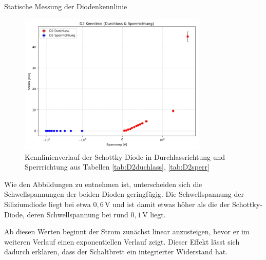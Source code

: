 \documentclass{article}
\theoremstyle{definition}
\begin{document}
\begin{aufgabe}{Statische Messung der Diodenkennlinie}
    \begin{figure}[H]
        \centering
        \includegraphics[width=0.8\textwidth]{figs/dioden_d2_combined.png}
        \caption{Kennlinienverlauf der Schottky-Diode in Durchlassrichtung und Sperrrichtung aus Tabellen \ref{tab:D2duchlass}, \ref{tab:D2sperr}}
        \label{dioden_d1_combined}
    \end{figure}

    Wie den Abbildungen zu entnehmen ist, unterscheiden sich die Schwellspannungen der beiden Dioden geringfügig. 
Die Schwellspannung der Siliziumdiode liegt bei etwa $0{,}6\,\mathrm{V}$ und ist damit etwas höher als die 
der Schottky-Diode, deren Schwellspannung bei rund $0{,}1\,\mathrm{V}$ liegt. 

Ab diesen Werten beginnt der Strom zunächst linear anzusteigen, bevor er im weiteren Verlauf 
einen exponentiellen Verlauf zeigt. Dieser Effekt lässt sich dadurch erklären, dass der Schaltbrett ein 
integrierter Widerstand hat. 

\end{aufgabe}
\newpage 
\end{document}
